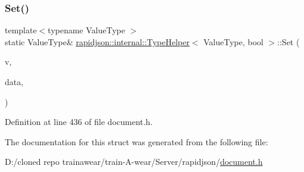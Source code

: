 \subsubsection{\texorpdfstring{Set()}{Set()}\hspace{0.1cm}{\footnotesize\ttfamily [2/2]}}
{\footnotesize\ttfamily template$<$typename Value\+Type $>$ \\
static Value\+Type\& \mbox{\hyperlink{structrapidjson_1_1internal_1_1_type_helper}{rapidjson\+::internal\+::\+Type\+Helper}}$<$ Value\+Type, bool $>$\+::Set (\begin{DoxyParamCaption}\item[{Value\+Type \&}]{v,  }\item[{bool}]{data,  }\item[{typename Value\+Type\+::\+Allocator\+Type \&}]{ }\end{DoxyParamCaption})\hspace{0.3cm}{\ttfamily [static]}}



Definition at line 436 of file document.\+h.


\begin{DoxyCode}{0}

\end{DoxyCode}


The documentation for this struct was generated from the following file\+:\begin{DoxyCompactItemize}
\item 
D\+:/cloned repo trainawear/train-\/\+A-\/wear/\+Server/rapidjson/\mbox{\hyperlink{document_8h}{document.\+h}}\end{DoxyCompactItemize}

